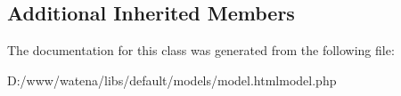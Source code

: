 \subsection*{Additional Inherited Members}


The documentation for this class was generated from the following file\-:\begin{DoxyCompactItemize}
\item 
D\-:/www/watena/libs/default/models/model.\-htmlmodel.\-php\end{DoxyCompactItemize}
